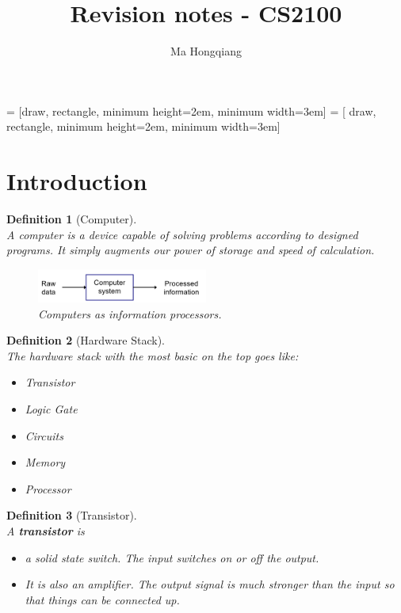 \documentclass[12pt]{article}
\newtheorem{definition}{Definition}[section]
\theoremstyle{definition}
\begin{document}
 = [draw, rectangle, minimum height=2em, minimum width=3em]
 = [ draw, rectangle, minimum height=2em, minimum width=3em]
\title{Revision notes - CS2100}
\author{Ma Hongqiang}
\maketitle
\tableofcontents

\clearpage
\section{Introduction}
\begin{definition}[Computer]
\hfill\\\normalfont
A computer is a device capable of solving problems according to designed programs. It simply augments our power of storage and speed of calculation. 
\begin{figure}[h]
\centering
\includegraphics[width = 0.5\textwidth]{1_1.png}
\caption{Computers as information processors.}
\end{figure}
\end{definition}
\begin{definition}[Hardware Stack]
\hfill\\\normalfont The hardware stack with the most basic on the top goes like: 
\begin{itemize}
  \item Transistor
  \item Logic Gate
  \item Circuits
  \item Memory
  \item Processor
\end{itemize}
\end{definition}
\begin{definition}[Transistor]
\hfill\\\normalfont A \textbf{transistor} is
\begin{itemize}
  \item a \textit{solid state switch}. The input switches on or off the output.
  \item It is also an \textit{amplifier}. The output signal is much stronger than the input so that things can be connected up.
\end{itemize}
\end{definition}
\end{document}
